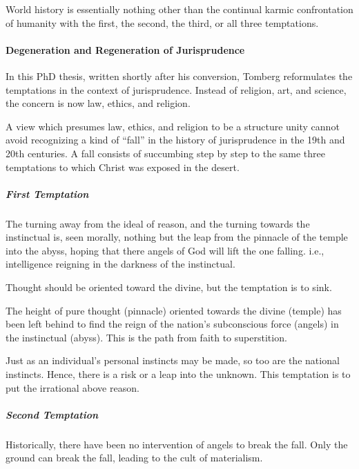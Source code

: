 \begin{quotex}
World history is essentially nothing other than the continual karmic confrontation of humanity with the first, the second, the third, or all three temptations. 

\end{quotex}
\paragraph{Degeneration and Regeneration of Jurisprudence}
In this PhD thesis, written shortly after his conversion, Tomberg reformulates the temptations in the context of jurisprudence. Instead of religion, art, and science, the concern is now law, ethics, and religion.

\begin{quotex}
A view which presumes law, ethics, and religion to be a structure unity cannot avoid recognizing a kind of “fall” in the history of jurisprudence in the 19th and 20th centuries. A fall consists of succumbing step by step to the same three temptations to which Christ was exposed in the desert. 

\end{quotex}
\subparagraph{First Temptation}
\begin{quotex}
The turning away from the ideal of reason, and the turning towards the instinctual is, seen morally, nothing but the leap from the pinnacle of the temple into the abyss, hoping that there angels of God will lift the one falling. i.e., intelligence reigning in the darkness of the instinctual. 

\end{quotex}
Thought should be oriented toward the divine, but the temptation is to sink.

\begin{quotex}
The height of pure thought (pinnacle) oriented towards the divine (temple) has been left behind to find the reign of the nation's subconscious force (angels) in the instinctual (abyss). This is the path from faith to superstition. 

\end{quotex}
Just as an individual's personal instincts may be made, so too are the national instincts. Hence, there is a risk or a leap into the unknown. This temptation is to put the irrational above reason.

\subparagraph{Second Temptation}
Historically, there have been no intervention of angels to break the fall. Only the ground can break the fall, leading to the cult of materialism.

